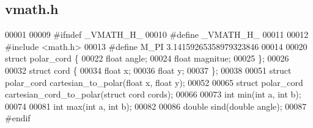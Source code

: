 \subsection{vmath.\+h}
\label{a00074_source}

\begin{DoxyCode}
00001 
00009 \textcolor{preprocessor}{#ifndef \_VMATH\_H\_}
00010 \textcolor{preprocessor}{#define \_VMATH\_H\_}
00011 
00012 \textcolor{preprocessor}{#include <math.h>}
00013 \textcolor{preprocessor}{#define M\_PI 3.14159265358979323846}
00014 
00020 \textcolor{keyword}{struct }polar_cord \{
00022   \textcolor{keywordtype}{float} angle;
00024   \textcolor{keywordtype}{float} magnitue;
00025 \};
00026 
00032 \textcolor{keyword}{struct }cord \{
00034   \textcolor{keywordtype}{float} x;
00036   \textcolor{keywordtype}{float} y;
00037 \};
00038 
00051 \textcolor{keyword}{struct }polar_cord cartesian_to_polar(float x, float y);
00052 
00065 \textcolor{keyword}{struct }polar_cord cartesian_cord_to_polar(struct cord cords);
00066 
00073 \textcolor{keywordtype}{int} min(\textcolor{keywordtype}{int} a, \textcolor{keywordtype}{int} b);
00074 
00081 \textcolor{keywordtype}{int} max(\textcolor{keywordtype}{int} a, \textcolor{keywordtype}{int} b);
00082 
00086 \textcolor{keywordtype}{double} sind(\textcolor{keywordtype}{double} angle);
00087 \textcolor{preprocessor}{#endif}
\end{DoxyCode}
